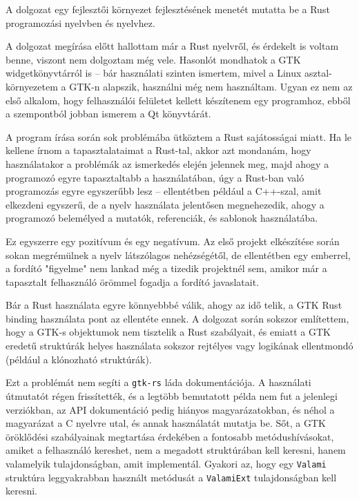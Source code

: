 

A dolgozat egy fejlesztői környezet fejlesztésének menetét mutatta be a Rust programozási nyelvben és nyelvhez.

A dolgozat megírása előtt hallottam már a Rust nyelvről, és érdekelt is voltam benne, 
viszont nem dolgoztam még vele.
Hasonlót mondhatok a GTK widgetkönyvtárról is -- bár használati szinten ismertem, 
mivel a Linux asztal-környezetem a GTK-n alapszik, használni még nem használtam.
Ugyan ez nem az első alkalom, hogy felhasználói felületet kellett készítenem egy programhoz,
ebből a szempontból jobban ismerem a Qt könyvtárát.

A program írása során sok problémába ütköztem a Rust sajátosságai miatt.
Ha le kellene írnom a tapasztalataimat a Rust-tal, akkor azt mondanám, hogy használatakor
a problémák az ismerkedés elején jelennek meg, majd ahogy a programozó egyre tapasztaltabb
a használatában, úgy a Rust-ban való programozás egyre egyszerűbb lesz --
ellentétben például a C++-szal, amit elkezdeni egyszerű, de a nyelv használata jelentősen megnehezedik,
ahogy a programozó belemélyed a mutatók, referenciák, és sablonok használatába.

Ez egyszerre egy pozitívum és egy negatívum.
Az első projekt elkészítése során sokan megrémülnek a nyelv látszólagos nehézségétől,
de ellentétben egy emberrel, a fordító "figyelme" nem lankad még a tizedik projektnél sem,
amikor már a tapasztalt felhasználó örömmel fogadja a fordító javaslatait.

Bár a Rust használata egyre könnyebbbé válik, ahogy az idő telik, a GTK Rust binding használata pont az ellentéte ennek.
A dolgozat során sokszor említettem, hogy a GTK-s objektumok nem tisztelik a Rust szabályait,
és emiatt a GTK eredetű struktúrák helyes használata sokszor rejtélyes vagy logikának ellentmondó
(például a klónozható struktúrák).

Ezt a problémát nem segíti a \texttt{gtk-rs} láda dokumentációja.
A használati útmutatót régen frissítették, és a legtöbb bemutatott példa nem fut a jelenlegi verziókban,
az API dokumentáció pedig hiányos magyarázatokban, és néhol a magyarázat a C nyelvre utal, és annak használatát mutatja be.
Sőt, a GTK öröklődési szabályainak megtartása érdekében a fontosabb metódushívásokat, amiket a felhasználó kereshet,
nem a megadott struktúrában kell keresni, hanem valamelyik tulajdonságban, amit implementál.
Gyakori az, hogy egy \texttt{Valami} struktúra 
leggyakrabban használt metódusát a \texttt{ValamiExt} tulajdonságban kell keresni.

